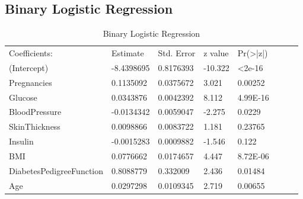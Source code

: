 \documentclass[12pt]{article}
\begin{document}
\subsection{Binary Logistic Regression}
\begin{table}[H]
\centering
\begin{tabular}{llllllll}
\cline{1-5}
\multicolumn{1}{|l|}{Coefficients:}             & \multicolumn{1}{l|}{Estimate}   & \multicolumn{1}{l|}{Std. Error} & \multicolumn{1}{l|}{z value} & \multicolumn{1}{l|}{Pr(\textgreater{}|z|)} &  &  &  \\ \cline{1-5}
\multicolumn{1}{|l|}{(Intercept)}              & \multicolumn{1}{l|}{-8.4398695} & \multicolumn{1}{l|}{0.8176393}  & \multicolumn{1}{l|}{-10.322} & \multicolumn{1}{l|}{\textless 2e-16}       &  &  &  \\ \cline{1-5}
\multicolumn{1}{|l|}{Pregnancies}              & \multicolumn{1}{l|}{0.1135092}  & \multicolumn{1}{l|}{0.0375672}  & \multicolumn{1}{l|}{3.021}   & \multicolumn{1}{l|}{0.00252}               &  &  &  \\ \cline{1-5}
\multicolumn{1}{|l|}{Glucose}                  & \multicolumn{1}{l|}{0.0343876}  & \multicolumn{1}{l|}{0.0042392}  & \multicolumn{1}{l|}{8.112}   & \multicolumn{1}{l|}{4.99E-16}              &  &  &  \\ \cline{1-5}
\multicolumn{1}{|l|}{BloodPressure}            & \multicolumn{1}{l|}{-0.0134342} & \multicolumn{1}{l|}{0.0059047}  & \multicolumn{1}{l|}{-2.275}  & \multicolumn{1}{l|}{0.0229}                &  &  &  \\ \cline{1-5}
\multicolumn{1}{|l|}{SkinThickness}            & \multicolumn{1}{l|}{0.0098866}  & \multicolumn{1}{l|}{0.0083722}  & \multicolumn{1}{l|}{1.181}   & \multicolumn{1}{l|}{0.23765}               &  &  &  \\ \cline{1-5}
\multicolumn{1}{|l|}{Insulin}                  & \multicolumn{1}{l|}{-0.0015283} & \multicolumn{1}{l|}{0.0009882}  & \multicolumn{1}{l|}{-1.546}  & \multicolumn{1}{l|}{0.122}                 &  &  &  \\ \cline{1-5}
\multicolumn{1}{|l|}{BMI}                      & \multicolumn{1}{l|}{0.0776662}  & \multicolumn{1}{l|}{0.0174657}  & \multicolumn{1}{l|}{4.447}   & \multicolumn{1}{l|}{8.72E-06}              &  &  &  \\ \cline{1-5}
\multicolumn{1}{|l|}{DiabetesPedigreeFunction} & \multicolumn{1}{l|}{0.8088779}  & \multicolumn{1}{l|}{0.332009}   & \multicolumn{1}{l|}{2.436}   & \multicolumn{1}{l|}{0.01484}               &  &  &  \\ \cline{1-5}
\multicolumn{1}{|l|}{Age}                      & \multicolumn{1}{l|}{0.0297298}  & \multicolumn{1}{l|}{0.0109345}  & \multicolumn{1}{l|}{2.719}   & \multicolumn{1}{l|}{0.00655}               &  &  &  \\ \cline{1-5}
\end{tabular}
\caption{Binary Logistic Regression }
\end{table}
\end{document}
